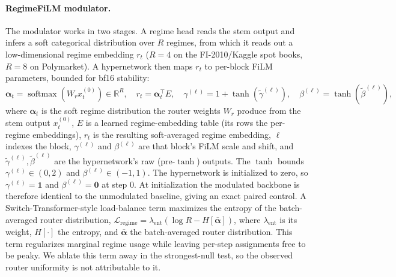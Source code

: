 \documentclass{article}
\newcommand{\R}{\mathbb{R}}
\DeclareMathOperator{\softmax}{softmax}
\begin{document}
\paragraph{RegimeFiLM modulator.} The modulator works in two stages. A regime head reads the stem output and infers a soft categorical distribution over $R$ regimes, from which it reads out a low-dimensional regime embedding $r_t$ ($R=4$ on the FI-2010/Kaggle spot books, $R=8$ on Polymarket). A hypernetwork then maps $r_t$ to per-block FiLM parameters, bounded for bf16 stability:
\begin{equation}
\bm{\alpha}_t = \softmax(W_r x_t^{(0)}) \in \R^R, \quad r_t = \bm{\alpha}_t^\top E, \quad \gamma^{(\ell)} = 1 + \tanh(\tilde{\gamma}^{(\ell)}), \quad \beta^{(\ell)} = \tanh(\tilde{\beta}^{(\ell)}),
\end{equation}
where $\bm{\alpha}_t$ is the soft regime distribution the router weights $W_r$ produce from the stem output $x_t^{(0)}$, $E$ is a learned regime-embedding table (its rows the per-regime embeddings), $r_t$ is the resulting soft-averaged regime embedding, $\ell$ indexes the block, $\gamma^{(\ell)}$ and $\beta^{(\ell)}$ are that block's FiLM scale and shift, and $\tilde{\gamma}^{(\ell)}, \tilde{\beta}^{(\ell)}$ are the hypernetwork's raw (pre-$\tanh$) outputs. The $\tanh$ bounds $\gamma^{(\ell)} \in (0,2)$ and $\beta^{(\ell)} \in (-1,1)$. The hypernetwork is initialized to zero, so $\gamma^{(\ell)}=\mathbf{1}$ and $\beta^{(\ell)}=\mathbf{0}$ at step 0. At initialization the modulated backbone is therefore identical to the unmodulated baseline, giving an exact paired control. A Switch-Transformer-style load-balance term \citep{fedus2022switch} maximizes the entropy of the batch-averaged router distribution, $\mathcal{L}_{\mathrm{regime}}=\lambda_{\mathrm{ent}}(\log R-H[\bar{\bm\alpha}])$, where $\lambda_{\mathrm{ent}}$ is its weight, $H[\cdot]$ the entropy, and $\bar{\bm\alpha}$ the batch-averaged router distribution. This term regularizes marginal regime usage while leaving per-step assignments free to be peaky. We ablate this term away in the strongest-null test, so the observed router uniformity is not attributable to it.
\end{document}
